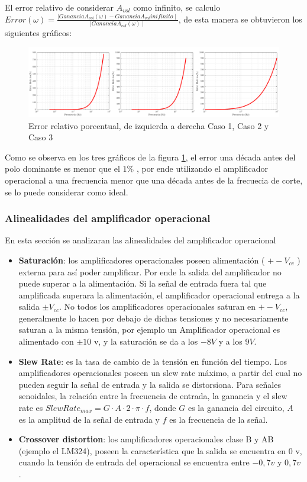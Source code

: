\documentclass[../../main.tex]{subfiles}
\begin{document}
El error relativo de considerar $A_{vol}$  como infinito, se calculo $ Error(\omega) = \frac {\mid Ganancia A_{vol}(\omega) -Ganancia A_{vol} inifinito \mid} {\mid Ganancia A_{vol} (\omega) \mid }$, de esta manera se obtuvieron los siguientes gr\'aficos:

\begin{figure}[H]
\centering
\includegraphics[width=1\textwidth]{imagenes/error_inv.png}
\caption{Error relativo porcentual, de izquierda a derecha Caso 1, Caso 2 y Caso 3} \label{fig=errorInv}
\end{figure}


Como se observa en los tres gr\'aficos de la figura \ref{fig=errorInv}, el error una d\'ecada antes del polo dominante es menor que el $1\%$ , por ende utilizando el amplificador operacional a una frecuencia menor que una d\'ecada antes de la frecuecia de corte, se lo puede considerar como ideal.



\subsubsection{Alinealidades del amplificador operacional}
En esta secci\'on se analizaran las alinealidades del amplificador operacional
\begin{itemize}  
\item \textbf{Saturación}: los amplificadores operacionales poseen alimentación ( $+-V_{cc}$ ) externa para así poder amplificar. Por ende la salida del amplificador no puede superar a la alimentación. Si la señal de entrada fuera tal que amplificada superara la alimentación, el amplificador operacional entrega a la salida $\pm V_{cc}$. No todos los amplificadores operacionales saturan en $+-V_{cc}$, generalmente lo hacen por debajo de dichas tensiones y no necesariamente saturan a la misma tensión, por ejemplo un Amplificador operacional es alimentado con $\pm10$ v, y la saturación se da a los $-8V$ y a los $9V$.
\item \textbf{Slew Rate}: es la tasa de cambio de la tensión en función del tiempo. Los amplificadores operacionales poseen un slew rate máximo, a partir del cual no pueden seguir la señal de entrada y la salida se distorsiona. Para señales senoidales, la relación entre la frecuencia de entrada, la ganancia y el slew rate es $ SlewRate_{max}=G \cdot A \cdot 2 \cdot \pi \cdot f $, donde $ G $ es la ganancia del circuito, $ A $ es la amplitud de la señal de entrada y $f$ es la frecuencia de la señal.
\item \textbf{Crossover distortion}: los amplificadores operacionales clase B y AB (ejemplo el LM324), poseen la característica que la salida se encuentra en 0 v, cuando la tensión de entrada del operacional se encuentra entre $-0,7 v$ y $0,7v$.
\end{itemize}
\end{document}
